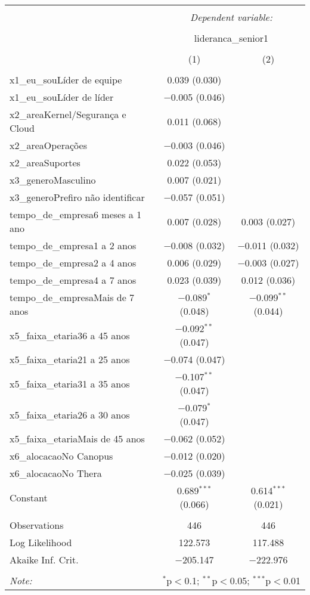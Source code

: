\documentclass[]{book}
\begin{document}
\begin{table}[!htbp] \centering 
  \caption{} 
  \label{} 
\begin{tabular}{@{\extracolsep{5pt}}lcc} 
\\[-1.8ex]\hline 
\hline \\[-1.8ex] 
 & \multicolumn{2}{c}{\textit{Dependent variable:}} \\ 
\cline{2-3} 
\\[-1.8ex] & \multicolumn{2}{c}{lideranca\_senior1} \\ 
\\[-1.8ex] & (1) & (2)\\ 
\hline \\[-1.8ex] 
 x1\_eu\_souLíder de equipe & 0.039 (0.030) &  \\ 
  x1\_eu\_souLíder de líder & $-$0.005 (0.046) &  \\ 
  x2\_areaKernel/Segurança e Cloud & 0.011 (0.068) &  \\ 
  x2\_areaOperações & $-$0.003 (0.046) &  \\ 
  x2\_areaSuportes & 0.022 (0.053) &  \\ 
  x3\_generoMasculino & 0.007 (0.021) &  \\ 
  x3\_generoPrefiro não identificar & $-$0.057 (0.051) &  \\ 
  tempo\_de\_empresa6 meses a 1 ano & 0.007 (0.028) & 0.003 (0.027) \\ 
  tempo\_de\_empresa1 a 2 anos & $-$0.008 (0.032) & $-$0.011 (0.032) \\ 
  tempo\_de\_empresa2 a 4 anos & 0.006 (0.029) & $-$0.003 (0.027) \\ 
  tempo\_de\_empresa4 a 7 anos & 0.023 (0.039) & 0.012 (0.036) \\ 
  tempo\_de\_empresaMais de 7 anos & $-$0.089$^{*}$ (0.048) & $-$0.099$^{**}$ (0.044) \\ 
  x5\_faixa\_etaria36 a 45 anos & $-$0.092$^{**}$ (0.047) &  \\ 
  x5\_faixa\_etaria21 a 25 anos & $-$0.074 (0.047) &  \\ 
  x5\_faixa\_etaria31 a 35 anos & $-$0.107$^{**}$ (0.047) &  \\ 
  x5\_faixa\_etaria26 a 30 anos & $-$0.079$^{*}$ (0.047) &  \\ 
  x5\_faixa\_etariaMais de 45 anos & $-$0.062 (0.052) &  \\ 
  x6\_alocacaoNo Canopus & $-$0.012 (0.020) &  \\ 
  x6\_alocacaoNo Thera & $-$0.025 (0.039) &  \\ 
  Constant & 0.689$^{***}$ (0.066) & 0.614$^{***}$ (0.021) \\ 
 \hline \\[-1.8ex] 
Observations & 446 & 446 \\ 
Log Likelihood & 122.573 & 117.488 \\ 
Akaike Inf. Crit. & $-$205.147 & $-$222.976 \\ 
\hline 
\hline \\[-1.8ex] 
\textit{Note:}  & \multicolumn{2}{r}{$^{*}$p$<$0.1; $^{**}$p$<$0.05; $^{***}$p$<$0.01} \\ 
\end{tabular} 
\end{table}
\end{document}
